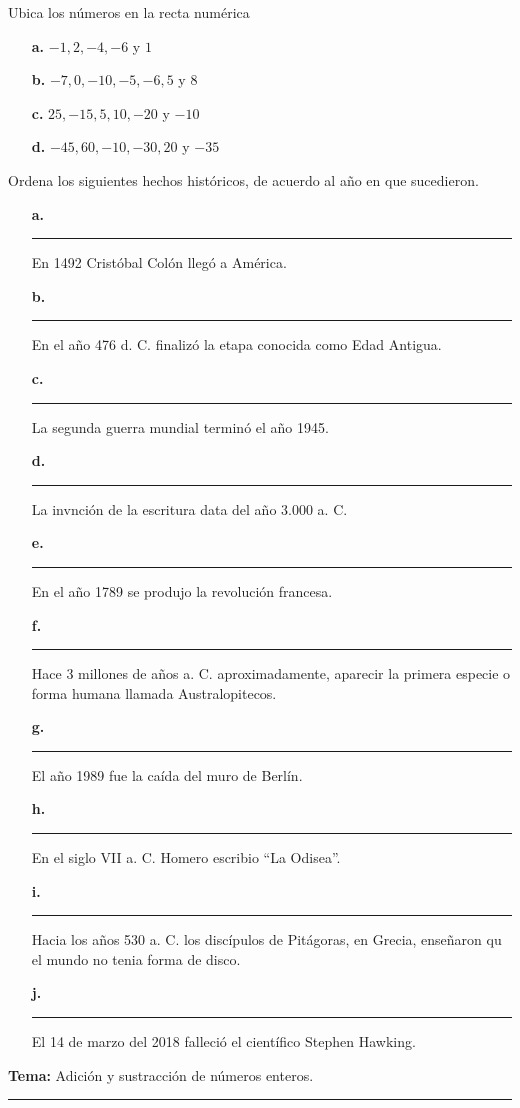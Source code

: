\documentclass[spanish,letterpaper, 11pt, addpoints, answers]{exam}
\begin{document}
\begin{questions}
  \question Ubica los números en la recta numérica

  \begin{itemize}
  \item[\textbf{a.}]$-1,2,-4,-6$ y $1$
  \item[\textbf{b.}]$-7,0,-10,-5,-6,5$ y $8$
  \item[\textbf{c.}]$25,-15,5,10,-20$ y $-10$
  \item[\textbf{d.}]$-45,60,-10,-30,20$ y $-35$
  \end{itemize}
  
  \question Ordena los siguientes hechos históricos, de acuerdo al año en que sucedieron.
  
  \begin{itemize}
  \item[\textbf{a.}]\rule{1cm}{0.4pt} En 1492 Cristóbal Colón llegó a América.
  \item[\textbf{b.}]\rule{1cm}{0.4pt} En el año 476 d. C. finalizó la etapa conocida como Edad Antigua.
  \item[\textbf{c.}]\rule{1cm}{0.4pt} La segunda guerra mundial terminó el año 1945.
  \item[\textbf{d.}]\rule{1cm}{0.4pt} La invnción de la escritura data del año 3.000 a. C.
  \item[\textbf{e.}]\rule{1cm}{0.4pt} En el año 1789 se produjo la revolución francesa.
  \item[\textbf{f.}]\rule{1cm}{0.4pt} Hace 3 millones de años a. C. aproximadamente, aparecir la primera especie o forma humana llamada Australopitecos.
  \item[\textbf{g.}]\rule{1cm}{0.4pt} El año 1989 fue la caída del muro de Berlín.
  \item[\textbf{h.}]\rule{1cm}{0.4pt} En el siglo VII a. C. Homero escribio ``La Odisea''.
  \item[\textbf{i.}]\rule{1cm}{0.4pt} Hacia los años 530 a. C. los discípulos de Pitágoras, en Grecia, enseñaron qu el mundo no tenia forma de disco.
  \item[\textbf{j.}]\rule{1cm}{0.4pt} El 14 de marzo del 2018 falleció el científico Stephen Hawking.
  \end{itemize}
\newpage
  \vspace{0.1in}
  \parbox{6in}{
  \textbf{Tema:} Adición y sustracción de números enteros.}
  \vspace{0.15in}
  \hrule 
  

\end{questions}
\end{document}
